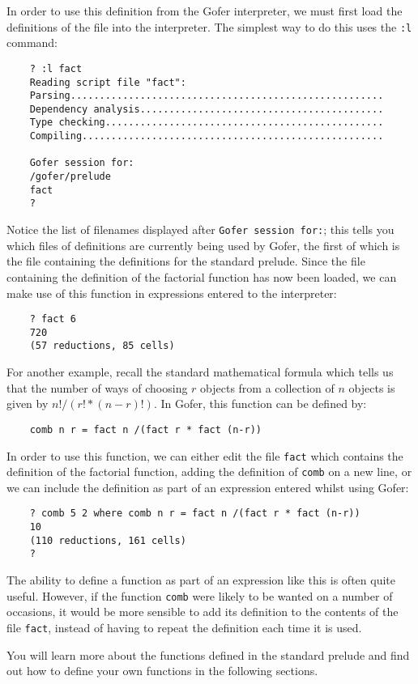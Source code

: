 In order to use this definition from the  Gofer  interpreter,  we  must
first load the definitions of  the  file  into  the  interpreter.   The
simplest way to do this uses the \verb":l" command:
\begin{verbatim}
    ? :l fact
    Reading script file "fact":
    Parsing......................................................
    Dependency analysis..........................................
    Type checking................................................
    Compiling....................................................

    Gofer session for:
    /gofer/prelude
    fact
    ?
\end{verbatim}
Notice the list of filenames displayed after \verb"Gofer session for:"; this
tells you which files of definitions are currently being used by Gofer,
the first of which is the  file  containing  the  definitions  for  the
standard prelude.  Since the file  containing  the  definition  of  the
factorial function has now  been  loaded,  we  can  make  use  of  this
function in expressions entered to the interpreter:
\begin{verbatim}
    ? fact 6
    720
    (57 reductions, 85 cells)
\end{verbatim}
For another example, recall the  standard  mathematical  formula  which
tells us that  the  number  of  ways  of  choosing  $r$  objects  from  a
collection of $n$ objects is given by $n! / (r! * (n-r)!)$.  In Gofer, this
function can be defined by:
\begin{verbatim}
    comb n r = fact n /(fact r * fact (n-r))
\end{verbatim}
In order to use this function, we can either edit the file \verb"fact" which
contains  the  definition  of  the  factorial  function,   adding   the
definition of \verb"comb" on a new line, or we can include the definition as
part of an expression entered whilst using Gofer:
\begin{verbatim}
    ? comb 5 2 where comb n r = fact n /(fact r * fact (n-r))
    10
    (110 reductions, 161 cells)
    ? 
\end{verbatim}
The ability to define a function as part of an expression like this  is
often quite useful.  However, if the function \verb"comb" were likely to  be
wanted on a number of occasions, it would be more sensible to  add  its
definition to the contents of the file \verb"fact",  instead  of  having  to
repeat the definition each time it is used.

You will learn more about the functions defined in the standard prelude
and find out  how  to  define  your  own  functions  in  the  following
sections.

